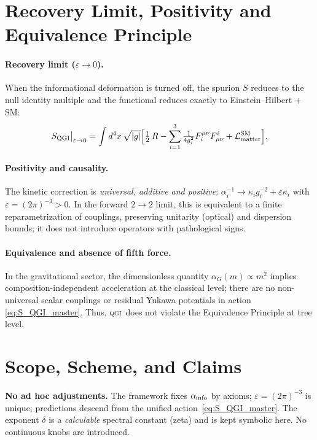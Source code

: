 \documentclass{article}
\numberwithin{equation}{section}
\theoremstyle{plain}
\theoremstyle{definition}
\theoremstyle{remark}
\newcommand{\qgi}{\textsc{qgi}}
\begin{document}
\section{Recovery Limit, Positivity and Equivalence Principle}
\label{sec:consistency_core}

\paragraph{Recovery limit (\(\varepsilon\to0\)).}
When the informational deformation is turned off, the spurion \(S\) reduces to the null identity multiple and the functional reduces exactly to Einstein–Hilbert + SM:
\begin{equation}
S_{\rm QGI}\big|_{\varepsilon\to0}
=\int d^4x\,\sqrt{|g|}\Big[\tfrac12\,R-\sum_{i=1}^3\tfrac{1}{4g_i^2}F_i^{\mu\nu}F^i_{\mu\nu}
+\mathcal{L}_{\rm matter}^{\rm SM}\Big].
\end{equation}

\paragraph{Positivity and causality.}
The kinetic correction is \emph{universal, additive and positive}:
\(\alpha_i^{-1}\to \kappa_i g_i^{-2}+\varepsilon\kappa_i\) with \(\varepsilon=(2\pi)^{-3}>0\).
In the forward \(2\!\to\!2\) limit, this is equivalent to a finite reparametrization of couplings, preserving unitarity (optical) and dispersion bounds; it does not introduce operators with pathological signs.

\paragraph{Equivalence and absence of fifth force.}
In the gravitational sector, the dimensionless quantity \(\alpha_G(m)\propto m^2\) implies composition-independent acceleration at the classical level; there are no non-universal scalar couplings or residual Yukawa potentials in action \eqref{eq:S_QGI_master}. Thus, \qgi\ does not violate the Equivalence Principle at tree level.
\section{Scope, Scheme, and Claims}
\label{sec:scope-scheme-claims}

\noindent\textbf{No ad hoc adjustments.}
The framework fixes $\alpha_{\rm info}$ by axioms; $\varepsilon=(2\pi)^{-3}$ is unique; predictions descend from the unified action~\eqref{eq:S_QGI_master}. The exponent $\delta$ is a \emph{calculable} spectral constant (zeta) and is kept symbolic here. No continuous knobs are introduced.
\end{document}
